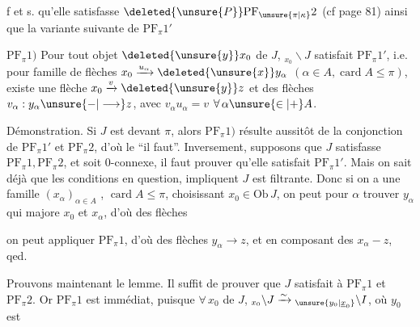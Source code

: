 
f et s. qu'elle  satisfasse $\deleted{\unsure{P}}\mathrm{PF}_{\unsure{\pi|\kappa}}2$ (cf page 81) ainsi que la variante suivante de $\mathrm{PF}_\pi1'$

$\mathrm{PF}_\pi1)$ Pour tout objet $\deleted{\unsure{y}}x_0$ de $J$, $ {}_{x_0}\backslash J$ satisfait $\mathrm{PF}_\pi1'$, i.e. pour  famille de flèches $x_0\xrightarrow{u_\alpha}\deleted{\unsure{x}}y_\alpha$ $(\alpha\in A,\operatorname{card} A\leq\pi)$, existe une  flèche $x_0\xrightarrow{v}\deleted{\unsure{y}}z$ et des flèches $v_\alpha:y_\alpha\unsure{\mathbin{-}|\longrightarrow}z$, avec $v_\alpha u_\alpha=v$ $\forall\,\alpha\unsure{\in|+} A$.

Démonstration. Si $J$ est  devant $\pi$, alors  $\mathrm{PF}_\pi1)$ résulte aussitôt de la conjonction de $\mathrm{PF}_\pi1'$ et $\mathrm{PF}_\pi2$, d'où le ``il faut''. Inversement, supposons que $J$ satisfasse $\mathrm{PF}_\pi1,\mathrm{PF}_\pi2$, et soit $0$-connexe, il faut prouver qu'elle satisfait $\mathrm{PF}_\pi1'$. Mais on sait déjà que les conditions en question,  impliquent     $J$ est filtrante. Donc si on a une famille $(x_\alpha)_{\alpha\in A}$ , $\operatorname{card} A\leq\pi$, choisissant  $x_0\in\mathrm{Ob}\,J$, on peut pour  $\alpha$ trouver $y_\alpha$ qui majore $x_0$ et $x_\alpha$, d'où des flèches


on peut  appliquer $\mathrm{PF}_\pi1$, d'où des flèches $y_\alpha\longrightarrow z$, et en composant des $x_\alpha\mathbin{-}z$, qed.

 Prouvons maintenant le lemme. Il  suffit  de prouver que $J$ satisfait à $\mathrm{PF}_\pi1$ et $\mathrm{PF}_\pi2$. Or $\mathrm{PF}_\pi1$ est immédiat, puisque $\forall\,x_0$ de $J$, $ {}_{x_0}\backslash J\xrightarrow{\sim}{}_{\unsure{y_0|\underline{x}_0}}\backslash I$, où $y_0$ est

